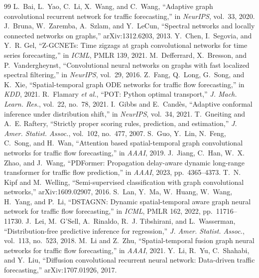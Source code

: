 \documentclass[conference]{IEEEtran}
\begin{document}
\begin{thebibliography}{99}
 L.~Bai, L.~Yao, C.~Li, X.~Wang, and C.~Wang, ``Adaptive graph convolutional recurrent network for traffic forecasting,'' in \emph{NeurIPS}, vol.~33, 2020.
 J.~Bruna, W.~Zaremba, A.~Szlam, and Y.~LeCun, ``Spectral networks and locally connected networks on graphs,'' arXiv:1312.6203, 2013.
 Y.~Chen, I.~Segovia, and Y.~R. Gel, ``Z-GCNETs: Time zigzags at graph convolutional networks for time series forecasting,'' in \emph{ICML}, PMLR 139, 2021.
 M.~Defferrard, X.~Bresson, and P.~Vandergheynst, ``Convolutional neural networks on graphs with fast localized spectral filtering,'' in \emph{NeurIPS}, vol.~29, 2016.
 Z.~Fang, Q.~Long, G.~Song, and K.~Xie, ``Spatial-temporal graph {ODE} networks for traffic flow forecasting,'' in \emph{KDD}, 2021.
 R.~Flamary \emph{et al.}, ``{POT}: Python optimal transport,'' \emph{J. Mach. Learn. Res.}, vol.~22, no.~78, 2021.
 I.~Gibbs and E.~Cand{\`e}s, ``Adaptive conformal inference under distribution shift,'' in \emph{NeurIPS}, vol.~34, 2021.
 T.~Gneiting and A.~E. Raftery, ``Strictly proper scoring rules, prediction, and estimation,'' \emph{J. Amer. Statist. Assoc.}, vol.~102, no.~477, 2007.
 S.~Guo, Y.~Lin, N.~Feng, C.~Song, and H.~Wan, ``Attention based spatial-temporal graph convolutional networks for traffic flow forecasting,'' in \emph{AAAI}, 2019.
 J.~Jiang, C.~Han, W.~X. Zhao, and J.~Wang, ``{PDFormer}: Propagation delay-aware dynamic long-range transformer for traffic flow prediction,'' in \emph{AAAI}, 2023, pp.~4365--4373.
 T.~N. Kipf and M.~Welling, ``Semi-supervised classification with graph convolutional networks,'' arXiv:1609.02907, 2016.
 S.~Lan, Y.~Ma, W.~Huang, W.~Wang, H.~Yang, and P.~Li, ``{DSTAGNN}: Dynamic spatial-temporal aware graph neural network for traffic flow forecasting,'' in \emph{ICML}, PMLR 162, 2022, pp.~11716--11730.
 J.~Lei, M.~G'Sell, A.~Rinaldo, R.~J. Tibshirani, and L.~Wasserman, ``Distribution-free predictive inference for regression,'' \emph{J. Amer. Statist. Assoc.}, vol.~113, no.~523, 2018.
 M.~Li and Z.~Zhu, ``Spatial-temporal fusion graph neural networks for traffic flow forecasting,'' in \emph{AAAI}, 2021.
 Y.~Li, R.~Yu, C.~Shahabi, and Y.~Liu, ``Diffusion convolutional recurrent neural network: Data-driven traffic forecasting,'' arXiv:1707.01926, 2017.

\end{thebibliography}
\end{document}
